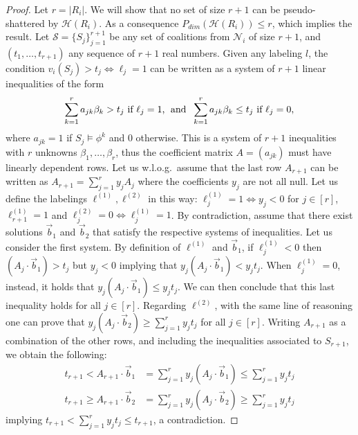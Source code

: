 \documentclass[letterpaper]{article} %
\newcommand{\modulus}[1]{\vert #1 \vert}
\newcommand{\hclass}{\ensuremath{\mathcal{H}}}
\newcommand{\sample}{\ensuremath{\mathcal{S}}}
\begin{document}
\begin{proof}
Let $r=\modulus{R_i}$. We will show that no set of size $r+1$ can be pseudo-shattered by $\hclass(R_i)$. As a consequence $P_{dim}\left(\hclass(R_i)\right) \leq r$, which implies the result.
%
Let $\sample = \{S_j\}_{j=1}^{r+1}$ be any set of coalitions from $\mathcal{N}_i$ of size $r+1$, and $(t_1, \ldots, t_{r+1})$ any sequence of $r+1$ real numbers. Given any labeling $l$, the condition $v_i(S_j) > t_j \Leftrightarrow \ell_j = 1$ can be written as a system of $r+1$ linear inequalities of the form
\[
    \sum_{k=1}^r a_{jk} \beta_k > t_j \text{ if } \ell_j=1 \text{,\; and \;}
    \sum_{k=1}^r a_{jk} \beta_k \leq t_j \text{ if } \ell_j=0,
\]
where $a_{jk}= 1$ if $S_j \models \phi^k$ and $0$ otherwise.
This is a system of $r+1$ inequalities with $r$ unknowns $\beta_1,\dots, \beta_r$, thus the coefficient matrix $A=(a_{jk})$ must have linearly dependent rows. Let us w.l.o.g.\ assume that the last row $A_{r+1}$ can be written as $A_{r+1} = \sum_{j=1}^r y_j A_j$ where the coefficients $y_j$ are not all null.
%
Let us define the labelings $\ell^{(1)}, \ell^{(2)}$ in this way: $\ell^{(1)}_j = 1 \Leftrightarrow y_j<0$ for $j\in[r]$, $\ell^{(1)}_{r+1}=1$ and $\ell^{(2)}_j = 0 \Leftrightarrow \ell^{(1)}_j =1$.
%
By contradiction, assume that there exist solutions $\vec{b}_1$ and $\vec{b}_2$ that satisfy the respective systems of inequalities. Let us consider the first system. By definition of $\ell^{(1)}$ and $\vec{b}_1$, if $\ell^{(1)}_j < 0$ then $\left(A_j \cdot \vec{b}_1\right)> t_j$ but $y_j <0$ implying that $y_j \left(A_j \cdot \vec{b}_1\right) < y_j t_j$. When $\ell^{(1)}_j = 0$, instead, it holds that $y_j \left(A_j \cdot \vec{b}_1\right) \leq y_j t_j$. We can then conclude that this last inequality holds for all $j \in [r]$. Regarding $\ell^{(2)}$, with the same line of reasoning one can prove that $y_j \left(A_j \cdot \vec{b}_2\right) \geq \sum_{j=1}^r y_j t_j$ for all $j \in [r]$. Writing $A_{r+1}$ as a combination of the other rows, and including the inequalities associated to $S_{r+1}$, we obtain the following:
\begin{align*}
    t_{r+1} < A_{r+1} \cdot \vec{b}_1 &= \sum_{j=1}^r y_j \left(A_j \cdot \vec{b}_1\right) \leq \sum_{j=1}^r y_j t_j\\
    t_{r+1} \geq A_{r+1} \cdot \vec{b}_2 &= \sum_{j=1}^r y_j \left(A_j \cdot \vec{b}_2\right) \geq \sum_{j=1}^r y_j t_j
\end{align*}
implying $t_{r+1} < \sum_{j=1}^r y_j t_j \le t_{r+1}$, a contradiction.
\end{proof}
\end{document}
